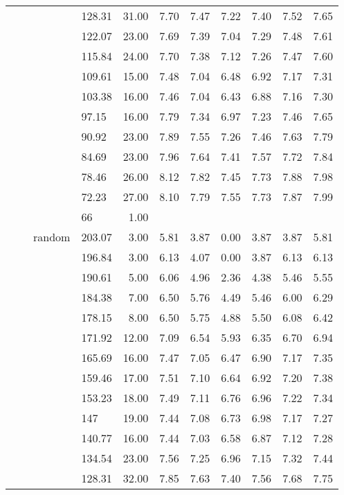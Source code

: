 \begin{longtable}{llllrrrrrrr}
   &  &  & 128.31 & 31.00 & 7.70 & 7.47 & 7.22 & 7.40 & 7.52 & 7.65 \\ 
   &  &  & 122.07 & 23.00 & 7.69 & 7.39 & 7.04 & 7.29 & 7.48 & 7.61 \\ 
   &  &  & 115.84 & 24.00 & 7.70 & 7.38 & 7.12 & 7.26 & 7.47 & 7.60 \\ 
   &  &  & 109.61 & 15.00 & 7.48 & 7.04 & 6.48 & 6.92 & 7.17 & 7.31 \\ 
   &  &  & 103.38 & 16.00 & 7.46 & 7.04 & 6.43 & 6.88 & 7.16 & 7.30 \\ 
   &  &  & 97.15 & 16.00 & 7.79 & 7.34 & 6.97 & 7.23 & 7.46 & 7.65 \\ 
   &  &  & 90.92 & 23.00 & 7.89 & 7.55 & 7.26 & 7.46 & 7.63 & 7.79 \\ 
   &  &  & 84.69 & 23.00 & 7.96 & 7.64 & 7.41 & 7.57 & 7.72 & 7.84 \\ 
   &  &  & 78.46 & 26.00 & 8.12 & 7.82 & 7.45 & 7.73 & 7.88 & 7.98 \\ 
   &  &  & 72.23 & 27.00 & 8.10 & 7.79 & 7.55 & 7.73 & 7.87 & 7.99 \\ 
   &  &  & 66 & 1.00 &  &  &  &  &  &  \\ 
   &  & random & 203.07 & 3.00 & 5.81 & 3.87 & 0.00 & 3.87 & 3.87 & 5.81 \\ 
   &  &  & 196.84 & 3.00 & 6.13 & 4.07 & 0.00 & 3.87 & 6.13 & 6.13 \\ 
   &  &  & 190.61 & 5.00 & 6.06 & 4.96 & 2.36 & 4.38 & 5.46 & 5.55 \\ 
   &  &  & 184.38 & 7.00 & 6.50 & 5.76 & 4.49 & 5.46 & 6.00 & 6.29 \\ 
   &  &  & 178.15 & 8.00 & 6.50 & 5.75 & 4.88 & 5.50 & 6.08 & 6.42 \\ 
   &  &  & 171.92 & 12.00 & 7.09 & 6.54 & 5.93 & 6.35 & 6.70 & 6.94 \\ 
   &  &  & 165.69 & 16.00 & 7.47 & 7.05 & 6.47 & 6.90 & 7.17 & 7.35 \\ 
   &  &  & 159.46 & 17.00 & 7.51 & 7.10 & 6.64 & 6.92 & 7.20 & 7.38 \\ 
   &  &  & 153.23 & 18.00 & 7.49 & 7.11 & 6.76 & 6.96 & 7.22 & 7.34 \\ 
   &  &  & 147 & 19.00 & 7.44 & 7.08 & 6.73 & 6.98 & 7.17 & 7.27 \\ 
   &  &  & 140.77 & 16.00 & 7.44 & 7.03 & 6.58 & 6.87 & 7.12 & 7.28 \\ 
   &  &  & 134.54 & 23.00 & 7.56 & 7.25 & 6.96 & 7.15 & 7.32 & 7.44 \\ 
   &  &  & 128.31 & 32.00 & 7.85 & 7.63 & 7.40 & 7.56 & 7.68 & 7.75 \\ 

\end{longtable}
